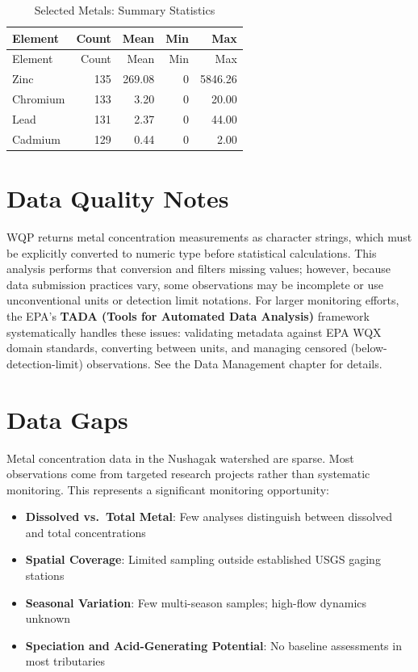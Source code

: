 \documentclass[
  letterpaper,
]{scrbook}
\providecommand{\tightlist}{%
  \setlength{\itemsep}{0pt}\setlength{\parskip}{0pt}}\usepackage{longtable,booktabs,array}
\begin{document}
\begin{longtable}[]{@{}lrrrr@{}}
\caption{Selected Metals: Summary Statistics}\tabularnewline
\toprule\noalign{}
Element & Count & Mean & Min & Max \\
\midrule\noalign{}
\endfirsthead
\toprule\noalign{}
Element & Count & Mean & Min & Max \\
\midrule\noalign{}
\endhead
\bottomrule\noalign{}
\endlastfoot
Zinc & 135 & 269.08 & 0 & 5846.26 \\
Chromium & 133 & 3.20 & 0 & 20.00 \\
Lead & 131 & 2.37 & 0 & 44.00 \\
Cadmium & 129 & 0.44 & 0 & 2.00 \\
\end{longtable}

\section{Data Quality Notes}\label{data-quality-notes}

WQP returns metal concentration measurements as character strings, which
must be explicitly converted to numeric type before statistical
calculations. This analysis performs that conversion and filters missing
values; however, because data submission practices vary, some
observations may be incomplete or use unconventional units or detection
limit notations. For larger monitoring efforts, the EPA's \textbf{TADA
(Tools for Automated Data Analysis)} framework systematically handles
these issues: validating metadata against EPA WQX domain standards,
converting between units, and managing censored (below-detection-limit)
observations. See the Data Management chapter for details.

\section{Data Gaps}\label{data-gaps}

Metal concentration data in the Nushagak watershed are sparse. Most
observations come from targeted research projects rather than systematic
monitoring. This represents a significant monitoring opportunity:

\begin{itemize}
\tightlist
\item
  \textbf{Dissolved vs.~Total Metal}: Few analyses distinguish between
  dissolved and total concentrations
\item
  \textbf{Spatial Coverage}: Limited sampling outside established USGS
  gaging stations
\item
  \textbf{Seasonal Variation}: Few multi-season samples; high-flow
  dynamics unknown
\item
  \textbf{Speciation and Acid-Generating Potential}: No baseline
  assessments in most tributaries
\end{itemize}
\end{document}
